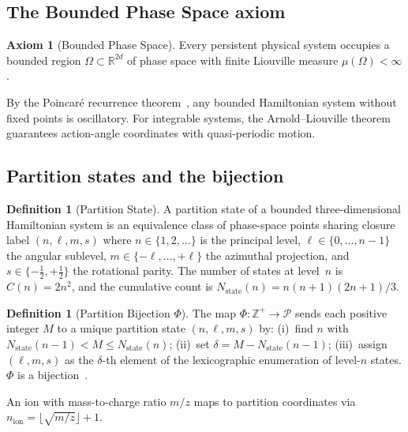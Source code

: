 \documentclass[twocolumn,10pt,a4paper]{article}
\theoremstyle{thmstyle}
\theoremstyle{definition}
\newtheorem{definition}[theorem]{Definition}
\newtheorem{axiom}{Axiom}
\theoremstyle{remark}
\newcommand{\R}{\mathbb{R}}
\newcommand{\Zp}{\mathbb{Z}^{+}}
\newcommand{\Parts}{\mathcal{P}}
\begin{document}
\subsection{The Bounded Phase Space axiom}

\begin{axiom}[Bounded Phase Space]
\label{ax:bps}
Every persistent physical system occupies a bounded region
$\Omega \subset \R^{2d}$ of phase space with finite Liouville measure
$\mu(\Omega) < \infty$.
\end{axiom}

By the Poincar\'{e} recurrence theorem~\citep{poincare1890}, any
bounded Hamiltonian system without fixed points is oscillatory. For
integrable systems, the Arnold--Liouville theorem~\citep{arnold1989}
guarantees action-angle coordinates with quasi-periodic motion.

\subsection{Partition states and the bijection}

\begin{definition}[Partition State]
\label{def:partition-state}
A partition state of a bounded three-dimensional Hamiltonian system is
an equivalence class of phase-space points sharing closure label
$(n, \ell, m, s)$ where $n \in \{1,2,\ldots\}$ is the principal level,
$\ell \in \{0,\ldots,n-1\}$ the angular sublevel,
$m \in \{-\ell,\ldots,+\ell\}$ the azimuthal projection, and
$s \in \{-\tfrac{1}{2},+\tfrac{1}{2}\}$ the rotational parity. The
number of states at level~$n$ is $C(n) = 2n^2$, and the cumulative
count is $N_{\mathrm{state}}(n) = n(n+1)(2n+1)/3$.
\end{definition}

\begin{definition}[Partition Bijection $\Phi$]
\label{def:bijection}
The map $\Phi\colon \Zp \to \Parts$ sends each positive integer
$M$ to a unique partition state $(n,\ell,m,s)$ by: (i)~find $n$ with
$N_{\mathrm{state}}(n-1) < M \le N_{\mathrm{state}}(n)$; (ii)~set
$\delta = M - N_{\mathrm{state}}(n-1)$; (iii)~assign $(\ell,m,s)$ as
the $\delta$-th element of the lexicographic enumeration of level-$n$
states. $\Phi$ is a bijection~\citep{sachikonye2024partition}.
\end{definition}

An ion with mass-to-charge ratio $m/z$ maps to partition coordinates
via $n_{\mathrm{ion}} = \lfloor\sqrt{m/z}\rfloor + 1$.
\end{document}
